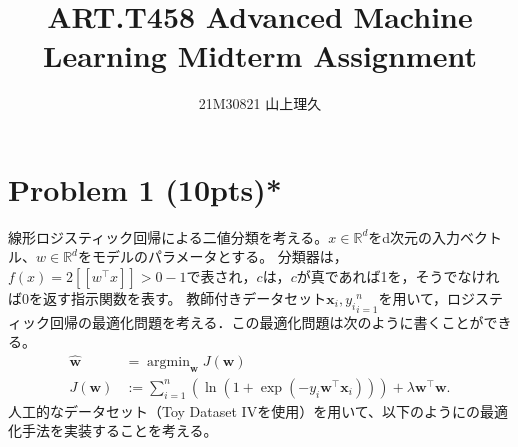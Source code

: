 \documentclass{jsarticle}
\title{ART.T458 Advanced Machine Learning Midterm Assignment}
\author{21M30821 山上理久}
\DeclareMathOperator*{\argmin}{argmin}
\begin{document}
\maketitle

\section*{Problem 1 (10pts)*}
線形ロジスティック回帰による二値分類を考える。$x \in \mathbb R^d$をd次元の入力ベクトル、$w \in \mathbb R^d$をモデルのパラメータとする。
分類器は，$f(x) = 2 [\![w^\top x]\!] > 0 - 1$で表され，$c$は，$c$が真であれば1を，そうでなければ0を返す指示関数を表す。
教師付きデータセット${\bm x_i, y_i}^n_{i=1}$を用いて，ロジスティック回帰の最適化問題を考える．この最適化問題は次のように書くことができる。
\begin{align*}
  \hat{\bm w} &=  \argmin_{\bm w} J(\bm w) \\
  J(\bm w) &:= \sum_{i=1}^n (\ln (1+\exp(-y_i\bm w^\top \bm x_i))) + \lambda\bm w^\top\bm w.
\end{align*}
人工的なデータセット（Toy Dataset IVを使用）を用いて、以下のようにの最適化手法を実装することを考える。
\end{document}
